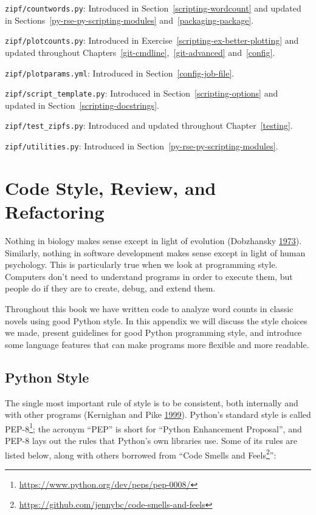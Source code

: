 \documentclass[
]{krantz}
\renewcommand{\href}[2]{#2\footnote{\url{#1}}}
\begin{document}
\texttt{zipf/countwords.py}: Introduced in Section~\ref{scripting-wordcount} and
updated in Sections~\ref{py-rse-py-scripting-modules} and~\ref{packaging-package}.

\texttt{zipf/plotcounts.py}: Introduced in Exercise~\ref{scripting-ex-better-plotting} and
updated throughout Chapters~\ref{git-cmdline},~\ref{git-advanced} and~\ref{config}.

\texttt{zipf/plotparams.yml}: Introduced in Section~\ref{config-job-file}.

\texttt{zipf/script\_template.py}: Introduced in Section~\ref{scripting-options} and
updated in Section~\ref{scripting-docstrings}.

\texttt{zipf/test\_zipfs.py}: Introduced and updated throughout Chapter~\ref{testing}.

\texttt{zipf/utilities.py}: Introduced in Section~\ref{py-rse-py-scripting-modules}.

\hypertarget{style}{%
\chapter{Code Style, Review, and Refactoring}\label{style}}

Nothing in biology makes sense except in light of evolution (Dobzhansky \protect\hyperlink{ref-Dobz1973}{1973}).
Similarly,
nothing in software development makes sense except in light of human psychology.
This is particularly true when we look at programming style.
Computers don't need to understand programs in order to execute them,
but people do if they are to create, debug, and extend them.

Throughout this book we have written code to analyze word counts in classic novels
using good Python style.
In this appendix we will discuss the style choices we made,
present guidelines for good Python programming style,
and introduce some language features that can make programs more flexible and more readable.

\hypertarget{style-pep8}{%
\section{Python Style}\label{style-pep8}}

The single most important rule of style is to be consistent,
both internally and with other programs (Kernighan and Pike \protect\hyperlink{ref-Kern1999}{1999}).
Python's standard style is called \href{https://www.python.org/dev/peps/pep-0008/}{PEP-8};
the acronym ``PEP'' is short for ``Python Enhancement Proposal'',
and PEP-8 lays out the rules that Python's own libraries use.
Some of its rules are listed below,
along with others borrowed from ``\href{https://github.com/jennybc/code-smells-and-feels}{Code Smells and Feels}'':
\end{document}
